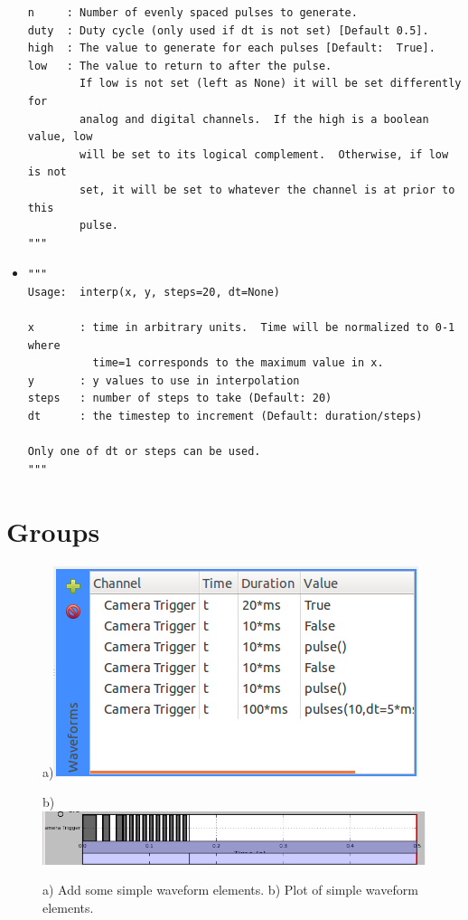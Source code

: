 \begin{itemize}
\begin{lstlisting}
n     : Number of evenly spaced pulses to generate.
duty  : Duty cycle (only used if dt is not set) [Default 0.5].
high  : The value to generate for each pulses [Default:  True].
low   : The value to return to after the pulse.
        If low is not set (left as None) it will be set differently for
        analog and digital channels.  If the high is a boolean value, low
        will be set to its logical complement.  Otherwise, if low is not
        set, it will be set to whatever the channel is at prior to this
        pulse.
"""
\end{lstlisting}

\item {}
\begin{lstlisting}
"""
Usage:  interp(x, y, steps=20, dt=None)

x       : time in arbitrary units.  Time will be normalized to 0-1 where
          time=1 corresponds to the maximum value in x.
y       : y values to use in interpolation
steps   : number of steps to take (Default: 20)
dt      : the timestep to increment (Default: duration/steps)

Only one of dt or steps can be used.
"""
\end{lstlisting}
\end{itemize}


\section{Groups}\label{sec:waveforms:groups}

\begin{figure}[ht]
  \centerline{a)\includegraphics[width=.5\textwidth]{figures/waveform-4}}
  \centerline{b)\includegraphics[width=.8\textwidth]{figures/plot-4}}
  \caption{a) Add some simple waveform elements. b) Plot of simple
  waveform elements.}
  \label{fig:quick:waveform-4}
\end{figure}

